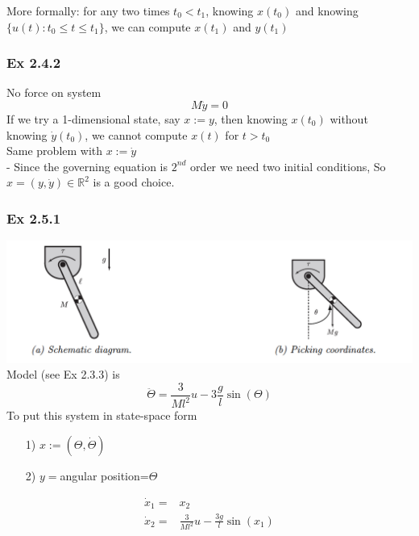 \documentclass[letterpaper]{article}
\begin{document}
More formally: for any two times $t_0<t_1$, knowing $x(t_0)$ and knowing $\{u(t): t_0 \leq t\leq t_1\}$, we can compute $x(t_1)$ and $y(t_1)$

\subsubsection*{Ex 2.4.2}
No force on system $$M\ddot y=0$$
If we try a 1-dimensional state, say $x:=y$, then knowing $x(t_0)$ without knowing $\dot y(t_0)$, we cannot compute $x(t)$ for $t>t_0$\\
Same problem with $x:=\dot y$\\
- Since the governing equation is $2^{nd}$ order we need two initial conditions, So $x=(y,\dot y)\in \mathbb{R}^2$ is a good choice.

\subsubsection*{Ex 2.5.1}
\includegraphics[scale=0.9]{images/Ex2_5_1.png}\\
Model (see Ex 2.3.3) is 
$$\ddot \Theta = \frac{3}{Ml^2}u-3\frac{g}{l}\sin(\Theta)$$
To put this system in state-space form\\
\begin{enumerate}
  \item[1)] $x:=(\Theta, \dot \Theta)$
  \item[2)] $y=$angular position=$\Theta$
\end{enumerate}
\begin{align*}
  \dot x_1= & x_2                                   \\
  \dot x_2= & \frac{3}{Ml^2}u-\frac{3g}{l}\sin(x_1) 
\end{align*}
\end{document}
